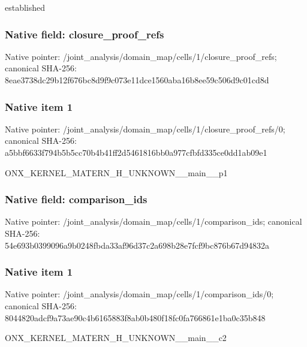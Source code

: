 \documentclass[10pt,a4paper]{article}
\begin{document}
\begingroup\raggedright\sloppy established\par\endgroup

\subsubsection{Native field: closure\_\allowbreak{}proof\_\allowbreak{}refs}
Native pointer: /joint\_\allowbreak{}analysis/domain\_\allowbreak{}map/cells/1/closure\_\allowbreak{}proof\_\allowbreak{}refs; canonical SHA-256: 8eae3738dc29b12f676bc8d9f9c073e11dce1560aba16b8ee59c506d9c01cd8d

\subsubsection{Native item 1}
Native pointer: /joint\_\allowbreak{}analysis/domain\_\allowbreak{}map/cells/1/closure\_\allowbreak{}proof\_\allowbreak{}refs/0; canonical SHA-256: a5bbf6633f794b5b5cc70b4b41ff2d5461816bb0a977cfbfd335ce0dd1ab09e1

\begingroup\raggedright\sloppy ONX\_\allowbreak{}KERNEL\_\allowbreak{}MATERN\_\allowbreak{}H\_\allowbreak{}UNKNOWN\_\allowbreak{}\_\allowbreak{}main\_\allowbreak{}\_\allowbreak{}p1\par\endgroup

\subsubsection{Native field: comparison\_\allowbreak{}ids}
Native pointer: /joint\_\allowbreak{}analysis/domain\_\allowbreak{}map/cells/1/comparison\_\allowbreak{}ids; canonical SHA-256: 54e693b0399096a9b0248fbda33af96d37c2a698b28e7fcf9bc876b67d94832a

\subsubsection{Native item 1}
Native pointer: /joint\_\allowbreak{}analysis/domain\_\allowbreak{}map/cells/1/comparison\_\allowbreak{}ids/0; canonical SHA-256: 8044820adcf9a73ae90c4b6165883f8ab0b480f18fc0fa766861e1ba0c35b848

\begingroup\raggedright\sloppy ONX\_\allowbreak{}KERNEL\_\allowbreak{}MATERN\_\allowbreak{}H\_\allowbreak{}UNKNOWN\_\allowbreak{}\_\allowbreak{}main\_\allowbreak{}\_\allowbreak{}c2\par\endgroup
\end{document}
